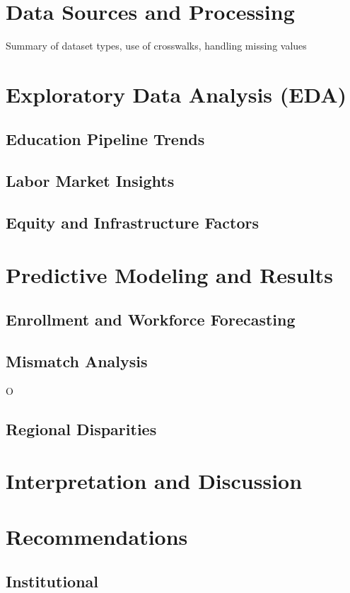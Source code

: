 \documentclass[12pt]{article}
\begin{document}
\section{Data Sources and Processing}
Summary of dataset types, use of crosswalks, handling missing values

\section{Exploratory Data Analysis (EDA)}
\subsection{Education Pipeline Trends}

\subsection{Labor Market Insights}

\subsection{Equity and Infrastructure Factors}


\section{Predictive Modeling and Results}
\subsection{Enrollment and Workforce Forecasting}

\subsection{Mismatch Analysis}
O
\subsection{Regional Disparities}


\section{Interpretation and Discussion}


\section{Recommendations}
\subsection{Institutional}
\end{document}
